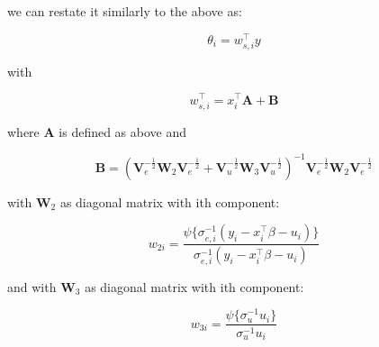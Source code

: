 we can restate it similarly to the above as:

\[
\theta_i = w_{s, i}^\top y
\]

with

\[
w_{s, i}^\top = x_i^\top \mathbf{A} + \mathbf{B}
\]

where $\mathbf{A}$ is defined as above and

\[
\mathbf{B} = 
\left(
  \mathbf{V}_e^{-\frac{1}{2}} \mathbf{W}_2 \mathbf{V}_e^{-\frac{1}{2}} +
  \mathbf{V}_u^{-\frac{1}{2}} \mathbf{W}_3 \mathbf{V}_u^{-\frac{1}{2}}
\right)^{-1} 
\mathbf{V}_e^{-\frac{1}{2}} \mathbf{W}_2 \mathbf{V}_e^{-\frac{1}{2}}
\]

with $\mathbf{W}_2$ as diagonal matrix with ith component:

\[
w_{2i} = 
\frac{
  \psi\{\sigma^{-1}_{e, i} (y_i - x_i^\top \beta - u_i)\}
}{
  \sigma^{-1}_{e, i} (y_i - x_i^\top \beta - u_i)
}
\]

and with $\mathbf{W}_3$ as diagonal matrix with ith component:

\[
w_{3i} = \frac{
  \psi\{\sigma_u^{-1} u_i\}
}{
  \sigma_u^{-1} u_i
}
\]
